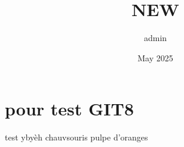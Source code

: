 \documentclass{article}
\title{NEW}
\author{admin }
\date{May 2025}
\begin{document}
\maketitle

\section{ pour test GIT8}
test ybyèh
chauvsouris
pulpe d'oranges 
\end{document}
